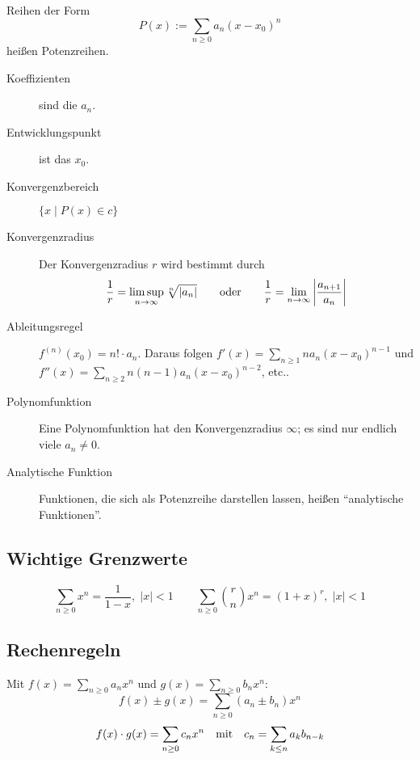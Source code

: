 Reihen der Form \[ P(x) := \sum_{n\geq0} a_n(x-x_0)^n \] heißen Potenzreihen.
\begin{description}
  \item [{Koeffizienten}] 
	sind die $a_n$.
  \item [{Entwicklungspunkt}] 
	ist das $x_0$.
  \item [{Konvergenzbereich}] 
	$\{ x \mid P(x) \in c \}$
  \item [{Konvergenzradius}] 
	Der Konvergenzradius $r$ wird bestimmt durch
	\[ \frac{1}{r} = \limsup_{n\to\infty}\sqrt[n]{\lvert a_n \rvert}
	\qquad\hbox{oder}\qquad
	\frac{1}{r} = \lim_{n\to\infty}\left|\frac{a_{n+1}}{a_n}\right|
	\]

  \item [{Ableitungsregel}] 
	$f^{(n)}(x_0) = n!\cdot a_n$.
	Daraus folgen $f'(x)=\sum_{n\geq1} na_n(x-x_0)^{n-1}$ und $f''(x) = \sum_{n\geq2} n(n-1)a_n(x-x_0)^{n-2}$, etc..
    
  \item[Polynomfunktion]
    Eine Polynomfunktion hat den Konvergenzradius $\infty$; es sind nur endlich viele $a_n \neq 0$.
  \item[Analytische Funktion]
    Funktionen, die sich als Potenzreihe darstellen lassen, heißen \enquote{analytische Funktionen}.
\end{description}

\subsection{Wichtige Grenzwerte}

\[
  \sum_{n\geq0} x^n = \frac{1}{1-x},\; \lvert x \rvert < 1
  \qquad
  \sum_{n\geq0} \binom{r}{n} x^n = (1+x)^r,\; \vert x \rvert < 1
\]

\subsection{Rechenregeln}

Mit $f(x) = \sum_{n\geq0} a_n x^n$ und $g(x)=\sum_{n\geq0} b_n x^n$:
\[ f(x) \pm g(x) = \sum_{n\geq0} (a_n \pm b_n) x^n \]
\[ f(x) \cdot g(x) = \sum_{n\geq0} c_n x^n \quad\hbox{mit}\quad c_n = \sum_{k \leq n} a_k b_{n-k} \]

